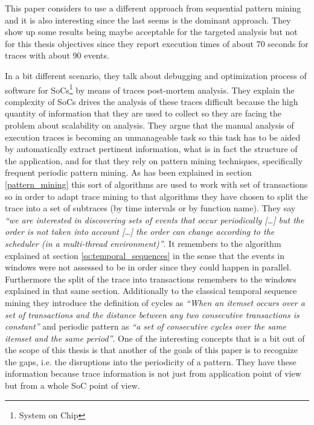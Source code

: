 This paper considers to use a different approach from sequential pattern mining
and it is also interesting since the last seems is the dominant approach. They show up
some results being maybe acceptable for the targeted analysis but not for this
thesis objectives since they report execution times of about 70 seconds for
traces with about 90 events.


In a bit different scenario, \cite{Lopez-Cueva2012} they talk about debugging 
and optimization process of
software for SoCs\footnote{System on Chip} by means of traces post-mortem
analysis. They explain the complexity of SoCs drives the analysis of these
traces difficult because the high quantity of information that they are used to
collect so they are facing the problem about scalability on analysis. They argue
that the manual analysis of execution traces is becoming an unmanageable task so
this task has to be aided by automatically extract pertinent information, what
is in fact the structure of the application, and for
that they rely on pattern mining techniques, specifically frequent periodic
pattern mining. As has been explained in section \ref{pattern_mining} this sort
of algorithms are used to work with set of transactions so in order to adapt
trace mining to that algorithms they have chosen to split the trace into a set
of subtraces (by time intervals or by function name). They say \textit{``we are
interested in discovering sets of events that occur periodically [\ldots] but
the order is not taken into account [\ldots] the order can change according to
the scheduler (in a multi-thread environment)''}. It remembers to the algorithm
explained at section \ref{ss:temporal_sequences} in the sense that the events in
windows were not assessed to be in order since they could happen in parallel.
Furthermore the split of the trace into transactions remembers to the windows
explained in that same section. Additionally to the classical temporal sequence
mining they introduce the definition of cycles as \textit{``When an itemset  occurs over 
a set of transactions and the distance between any two consecutive transactions 
is constant''} and periodic pattern as \textit{``a set of consecutive cycles over the
same itemset and the same period''}. One of the interesting concepts that is a
bit out of the scope of this thesis is that another of the goals of this paper
is to recognize the gaps, i.e. the disruptions into the periodicity of a
pattern. They have these information because trace information is not just from
application point of view but from a whole SoC point of view. 

